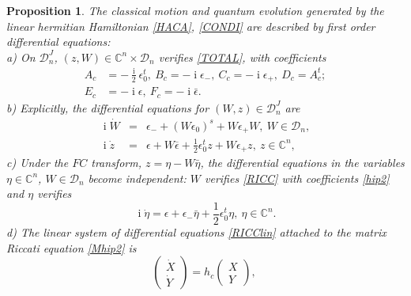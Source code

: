 \documentclass[12pt]{amsart}
\numberwithin{equation}{section}
\newtheorem{Proposition}{Proposition}
\theoremstyle{definition}
\begin{document}
\begin{Proposition} \label{POYT}
The classical motion and quantum evolution generated by  the linear
hermitian  Hamiltonian \eqref{HACA}, \eqref{CONDI}  are described by
first order differential equations:\\
a) On ${{\mathcal{{D}}}}^J_n$,  $(z,W)\in {\ensuremath{\mathbb{C}}}^n\times{{\mathcal{{D}}}}_n$ verifies
\eqref{TOTAL}, 
with coefficients
 \begin{subequations}\label{hip}
\begin{align}
A_c & =  -\frac{\operatorname{i}}{2}\epsilon_0^t, ~ B_c=-{\operatorname{i}}\epsilon_-, ~C_c=-{\operatorname{i}}\epsilon_+, ~
D_c= A_c^t ; \label{hip2}\\
E_c & =-{\operatorname{i}}\epsilon, ~F_c=-{\operatorname{i}}\bar{\epsilon}\label{hip1}.
\end{align}
\end{subequations}
b) Explicitly,  the differential equations  for $(W,z)\in{{\mathcal{{D}}}}^J_n$ are
\begin{subequations}\label{Mhip}
\begin{eqnarray}
{\operatorname{i}} \dot{W}  & = &\epsilon_-  +
(W\epsilon_0)^s +W\epsilon_+W, ~ W\in{{\mathcal{{D}}}}_n,\label{Mhip2}\\
{\operatorname{i}} \dot{z} & = & \epsilon +
W\overline{\epsilon}+  \frac{1}{2}\epsilon_0^tz+W\epsilon_+z,
~z\in{\ensuremath{\mathbb{C}}}^n , \label{Mhip1}
\end{eqnarray}
\end{subequations}
c) Under the $FC$ transform, $z=\eta-W\bar{\eta}$,   
the differential equations 
 in the variables $\eta\in{\ensuremath{\mathbb{C}}}^n$, $W\in{{\mathcal{{D}}}}_n$ become independent:  $W$
verifies \eqref{RICC}  with coefficients \eqref{hip2} and $\eta $ verifies  
\begin{equation}\label{hipPRT1}
{\operatorname{i}} \dot{\eta} =  \epsilon +
\epsilon_-\bar{\eta} + \frac{1}{2}\epsilon_0^t\eta,~\eta\in{\ensuremath{\mathbb{C}}}^n.
\end{equation}
d) The linear system of differential equations  \eqref{RICClin} attached to the matrix
Riccati equation \eqref{Mhip2} is
 \begin{equation}\label{Rlin}
\left( \begin{array}{c}\dot{X}\\\dot{Y}\end{array}\!\right)=h_c
\left(\! \begin{array}{c}{X}\\{Y}\end{array}\right), ~

\end{equation}
\end{Proposition}
\end{document}
